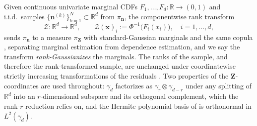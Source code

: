 \documentclass[review,hidelinks,onefignum,onetabnum]{siamart251216}
\newcommand{\RR}{\mathbb{R}}
\newcommand{\gauss}{\gamma}
\newcommand{\vn}{\bm{n}}
\newcommand{\vx}{\bm{x}}
\newcommand{\vZ}{\bm{Z}}
\newcommand{\scZ}{\mathcal{Z}}
\begin{document}
Given continuous univariate marginal CDFs $F_1,\ldots,F_d: \RR\to(0,1)$ and i.i.d.\ samples $\{\vn^{(k)}\}_{k=1}^N \subset \RR^d$ from $\pi_{\vn}$, the componentwise rank transform
\begin{equation}
  \scZ: \RR^d \to \RR^d, \qquad
  \scZ(\vx)_i := \Phi^{-1}\bigl(F_i(x_i)\bigr), \quad i=1,\ldots,d,
  \label{eq:rank-transform}
\end{equation}
sends $\pi_{\vn}$ to a measure $\pi_{\vZ}$ with standard-Gaussian marginals and the same copula \cite{Sklar1959, Nelsen2006book}, separating marginal estimation from dependence estimation, and we say the transform \emph{rank-Gaussianizes} the marginals. The ranks of the sample, and therefore the rank-transformed sample, are unchanged under coordinatewise strictly increasing transformations of the residuals \cite{LiuLaffertyWasserman2009nonparanormal}. Two properties of the $\vZ$-coordinates are used throughout: $\gauss_d$ factorizes as $\gauss_r\otimes\gauss_{d-r}$ under any splitting of $\RR^d$ into an $r$-dimensional subspace and its orthogonal complement, which the rank-$r$ reduction relies on, and the Hermite polynomial basis of  is orthonormal in $L^2(\gauss_d)$.
\end{document}
